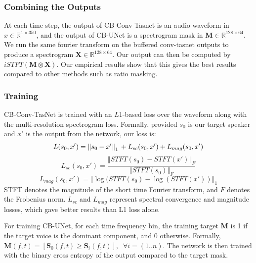 \documentclass [11pt, proquest] {uwthesis}[2020/02/24]
\begin{document}
\subsubsection{Combining the Outputs}
At each time step, the output of CB-Conv-Tasnet is an audio waveform in $x \in \mathbb{R}^{1 \times 350}$, and the output of CB-UNet is a spectrogram mask in $\textbf{M} \in \mathbb{R}^{128 \times 64}$. We run the same fourier transform on the buffered conv-tasnet outputs to produce a spectrogram $\textbf{X} \in \mathbb{R}^{128 \times 64}$. Our output can then be computed by $iSTFT(\textbf{M} \otimes \textbf{X})$.
 Our empirical results show that  this gives the best results compared to other methods such as ratio masking.

\subsubsection{Training}
CB-Conv-TasNet is trained with an $L1$-based loss over the waveform along with the multi-resolution spectrogram loss. Formally, provided $s_{0}$ is our target speaker and $x'$ is the output from the network, our loss is:
\begin{equation*}
    L(s_{0}, x') = \left\Vert s_{0} - x' \right\Vert_1 \\ + L_{sc}(s_0, x') + L_{mag}(s_0, x')
\end{equation*}
\begin{equation*}
L_{sc}(s_0, x') = \frac{\left\Vert STFT(s_0) - STFT(x')\right\Vert_F}{\left\Vert STFT(s_0)\right\Vert_F}
\end{equation*}
\begin{equation*}
L_{mag}(s_0, x') = \left\Vert \log(STFT(s_0) - \log(STFT(x'))  \right\Vert_1
\end{equation*}
STFT denotes the magnitude of the short time Fourier transform, and $F$ denotes the Frobenius norm. $L_{sc}$ and $L_{mag}$ represent  spectral convergence and magnitude losses, which  gave better results than L1 loss alone.

For training CB-UNet, for each time frequency bin, the training target $\textbf{M}$ is 1 if the target voice is the dominant component, and 0 otherwise. Formally, $\textbf{M}(f, t) = [\textbf{S}_{0}(f, t) \geq \textbf{S}_{i}(f, t)], \;\; \forall i = (1..n)$. The network is then trained with the binary cross entropy of the output compared to the target mask.
\end{document}

